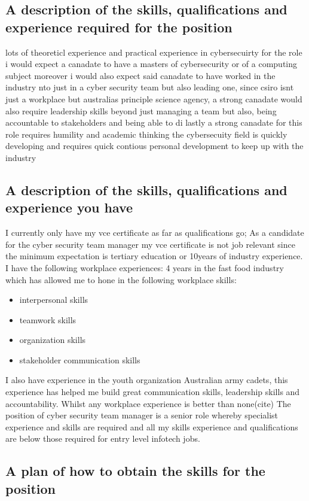 \documentclass{article}
\begin{document}
\subsection{A description of the skills, qualifications and experience required for the position}

lots of theoreticl experience and practical experience in cybersecuirty for the role i would expect  a canadate to have a masters of cybersecurity or of a computing subject moreover i would also expect said canadate to have worked in the industry nto just in a cyber security team but also leading one, since csiro isnt just a workplace but australias principle science agency, a strong canadate would also require leadership skills beyond just managing a team but also, being accountable to stakeholders and being able to di
lastly a strong canadate for this role requires humility and academic thinking the cybersecuity field is quickly developing and requires quick contious personal development to keep up with the industry

\subsection{A description of the skills, qualifications and experience you have}
I currently only have my vce certificate as far as qualifications go; As a candidate for the cyber security team manager my vce certificate is not job relevant since the minimum expectation is tertiary education or 10years of industry experience.
I have the following workplace experiences:
4 years in the fast food industry which has allowed me to hone in the following workplace skills:
\begin{itemize}
\item interpersonal skills
\item teamwork skills
\item organization skills
\item stakeholder communication skills 
\end{itemize}
I also have experience in the youth organization Australian army cadets, this experience has helped me build great communication skills, leadership skills and accountability.  Whilst any workplace experience is better than none(cite) The position of cyber security team manager is a senior role whereby specialist experience and skills are required and all my skills experience and qualifications are below those required for entry level infotech jobs.

\subsection{A plan of how to obtain the skills for the position}
\end{document}
